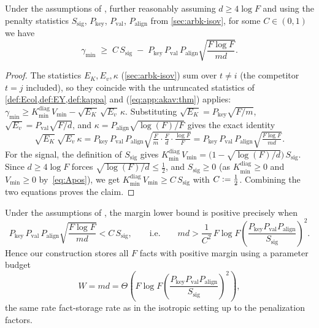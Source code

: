 \begin{corollary}\label{cor:bilinear-scaling-simplified}
Under the assumptions of , further reasonably assuming $d\ge 4\log F$ and using the penalty statistics $S_{\mathrm{sig}}$, $P_{\mathrm{key}}$, $P_{\mathrm{val}}$, $P_{\mathrm{align}}$ from \cref{sec:arbk-isov}, for some $C\in(0,1)$ we have
\[
\gamma_{\min}
\;\geq\;
C\,S_{\mathrm{sig}}
\;-\;
P_{\mathrm{key}}\,P_{\mathrm{val}}\,P_{\mathrm{align}}\sqrt{\frac{F\log F}{md}}.
\]
\end{corollary}
\begin{proof}
The statistics $E_K,E_v,\kappa$ (\cref{sec:arbk-isov}) sum over $t\neq i$ (the competitor $t=j$ included), so they coincide with the untruncated statistics of \cref{def:Ecol,def:EY,def:kappa} and  (\cref{eq:app:akav:thm}) applies:
\(
\gamma_{\min}\ge K_{\min}^{\mathrm{diag}}\,V_{\min}-\sqrt{E_K}\,\sqrt{E_v}\,\kappa.
\)
Substituting $\sqrt{E_K}=P_{\mathrm{key}}\sqrt{F/m}$, $\sqrt{E_v}=P_{\mathrm{val}}\sqrt{F/d}$, and $\kappa=P_{\mathrm{align}}\sqrt{\log(F)/F}$ gives the exact identity
\[
\sqrt{E_K}\,\sqrt{E_v}\,\kappa
= P_{\mathrm{key}}\,P_{\mathrm{val}}\,P_{\mathrm{align}}\sqrt{\tfrac{F}{m}\cdot\tfrac{F}{d}\cdot\tfrac{\log F}{F}}
= P_{\mathrm{key}}\,P_{\mathrm{val}}\,P_{\mathrm{align}}\sqrt{\tfrac{F\log F}{md}}.
\]
For the signal, the definition of $S_{\mathrm{sig}}$ gives $K_{\min}^{\mathrm{diag}}\,V_{\min}=\big(1-\sqrt{\log(F)/d}\big)\,S_{\mathrm{sig}}$. Since $d\ge 4\log F$ forces $\sqrt{\log(F)/d}\le\tfrac12$, and $S_{\mathrm{sig}}\ge 0$ (as $K_{\min}^{\mathrm{diag}}\ge 0$ and $V_{\min}\ge 0$ by~\cref{eq:Apos}), we get $K_{\min}^{\mathrm{diag}}\,V_{\min}\ge C\,S_{\mathrm{sig}}$ with $C\vcentcolon=\tfrac12$. Combining the two equations proves the claim.
\end{proof}

\begin{corollary}\label{cor:optimal-fact-storage-capacity-arb-formal}
Under the assumptions of , the margin lower bound is positive precisely when
\[
P_{\mathrm{key}}\,P_{\mathrm{val}}\,P_{\mathrm{align}}\sqrt{\frac{F\log F}{md}} < C\,S_{\mathrm{sig}},
\qquad\text{i.e.}\qquad
md > \frac{1}{C^2}\,F\log F\left(\frac{P_{\mathrm{key}} P_{\mathrm{val}} P_{\mathrm{align}}}{S_{\mathrm{sig}}}\right)^{\!2}.
\]
Hence our construction stores all $F$ facts with positive margin using a parameter budget
\[
W = md = \Theta\!\left(F\log F\left(\frac{P_{\mathrm{key}} P_{\mathrm{val}} P_{\mathrm{align}}}{S_{\mathrm{sig}}}\right)^{\!2}\right),
\]
the same rate fact-storage rate as in the isotropic setting up to the penalization factors.
\end{corollary}


